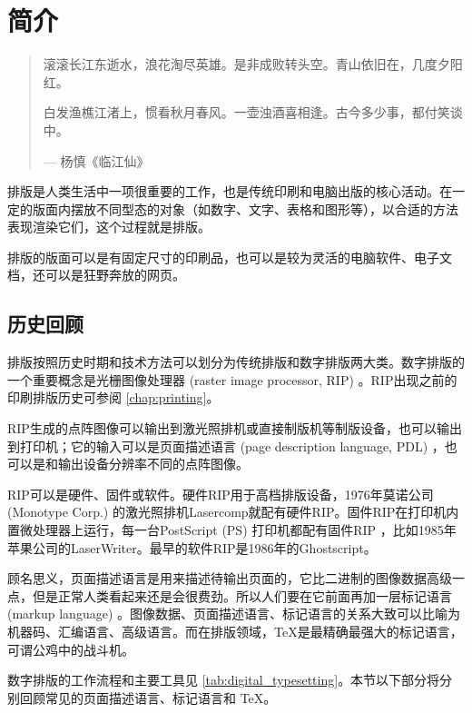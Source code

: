 \chapter{简介}
\label{chap:introduction}

\begin{quotation}
滚滚长江东逝水，浪花淘尽英雄。是非成败转头空。青山依旧在，几度夕阳红。

白发渔樵江渚上，惯看秋月春风。一壶浊酒喜相逢。古今多少事，都付笑谈中。
\begin{flushright}
    --- 杨慎《临江仙》
\end{flushright}
\end{quotation}

排版是人类生活中一项很重要的工作，也是传统印刷和电脑出版的核心活动。在一定的版面内摆放不同型态的对象（如数字、文字、表格和图形等），以合适的方法表现渲染它们，这个过程就是排版。

排版的版面可以是有固定尺寸的印刷品，也可以是较为灵活的电脑软件、电子文档，还可以是狂野奔放的网页。

\section{历史回顾}
\label{sec:digital_typesetting}

排版按照历史时期和技术方法可以划分为传统排版和数字排版两大类。数字排版的一个重要概念是光栅图像处理器 (raster image processor, RIP) 。RIP出现之前的印刷排版历史可参阅 \autoref{chap:printing}。

RIP生成的点阵图像可以输出到激光照排机或直接制版机等制版设备，也可以输出到打印机；它的输入可以是页面描述语言 (page description language, PDL) ，也可以是和输出设备分辨率不同的点阵图像。

RIP可以是硬件、固件或软件。硬件RIP用于高档排版设备，1976年莫诺公司 (Monotype Corp.)\indexMonotype{} 的激光照排机Lasercomp就配有硬件RIP。固件RIP在打印机内置微处理器上运行，每一台PostScript (PS) 打印机都配有固件RIP ，比如1985年苹果公司\indexApple 的LaserWriter。最早的软件RIP是1986年的Ghostscript。

顾名思义，页面描述语言是用来描述待输出页面的，它比二进制的图像数据高级一点，但是正常人类看起来还是会很费劲。所以人们要在它前面再加一层标记语言 (markup language) 。图像数据、页面描述语言、标记语言的关系大致可以比喻为机器码、汇编语言、高级语言。而在排版领域，\TeX 是最精确最强大的标记语言，可谓公鸡中的战斗机。

数字排版的工作流程和主要工具见 \autoref{tab:digital_typesetting}。本节以下部分将分别回顾常见的页面描述语言、标记语言和 \TeX。

